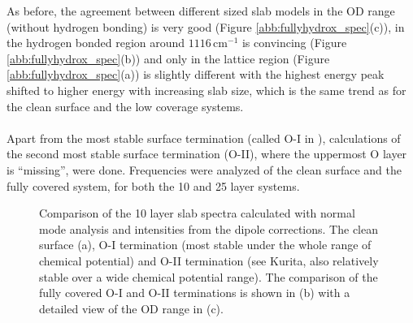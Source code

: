 \documentclass[11pt,DIV=13,BCOR=5mm,a4paper,headinclude]{scrbook}
\begin{document}
 As before, the agreement between different sized slab models in the OD range (without hydrogen bonding) is very good (Figure \ref{abb:fullyhydrox_spec}(c)), in the hydrogen bonded region around $1116\,$cm$^{-1}$ is convincing (Figure \ref{abb:fullyhydrox_spec}(b)) and only in the lattice region (Figure \ref{abb:fullyhydrox_spec}(a)) is slightly different with the highest energy peak shifted to higher energy with increasing slab size, which is the same trend as for the clean surface and the low coverage systems.
\\\\
 Apart from the most stable surface termination (called O-I in \cite{kuri10}), calculations of the second most stable surface termination (O-II), where the uppermost O layer is ``missing'', were done.
Frequencies were analyzed of the clean surface and the fully covered system, for both the 10 and 25 layer systems.
 \begin{figure}[!h]
 \centering
 \quad
 \quad
 \caption{Comparison of the 10 layer slab spectra calculated with normal mode analysis and intensities from the dipole corrections.
The clean surface (a), O-I termination (most stable under the whole range of chemical potential) and O-II termination (see Kurita\cite{kuri10}, also relatively stable over a wide chemical potential range).
The comparison of the fully covered O-I and O-II terminations is shown in (b) with a detailed view of the OD range in (c).}
 \label{abb:comp_O-I-O-II}
\end{figure}
\end{document}
